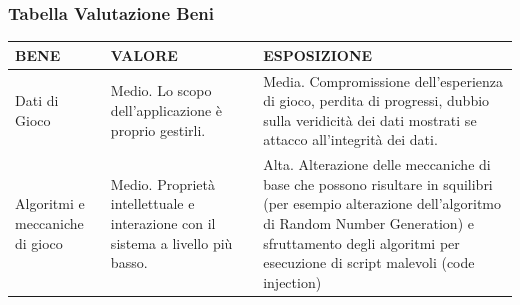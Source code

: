 \documentclass[a4paper, 11pt]{article}
\begin{document}
\subsubsection*{Tabella Valutazione Beni}
\begin{center}
    \begin{tabular}{ |p{4.5cm}|p{3.5cm}|p{4cm}|  }
        \hline
        \textbf{BENE} & \textbf{VALORE} & \textbf{ESPOSIZIONE} \\
        \hline
        Dati di Gioco & Medio. Lo scopo dell’applicazione è proprio gestirli. & Media. Compromissione dell’esperienza di gioco, perdita di progressi, dubbio sulla veridicità dei dati mostrati se attacco all’integrità dei dati. \\
        \hline
        Algoritmi e meccaniche di gioco & Medio. Proprietà intellettuale e interazione con il sistema a livello più basso. & Alta. Alterazione delle meccaniche di base che possono risultare in squilibri (per esempio alterazione dell’algoritmo di Random Number Generation) e sfruttamento degli algoritmi per esecuzione di script malevoli (code injection) \\
        \hline
    \end{tabular}
\end{center}
\end{document}
